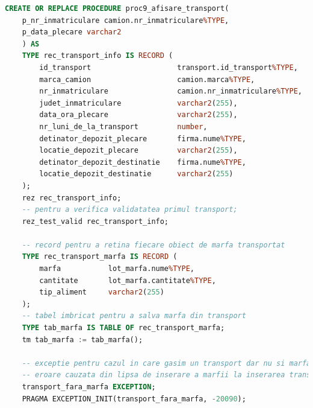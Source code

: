 \documentclass[12pt, a4paper]{article}
\begin{document}
\begin{lstlisting}[language=SQL]
CREATE OR REPLACE PROCEDURE proc9_afisare_transport(
    p_nr_inmatriculare camion.nr_inmatriculare%TYPE,
    p_data_plecare varchar2
    ) AS
    TYPE rec_transport_info IS RECORD (
        id_transport                    transport.id_transport%TYPE,
        marca_camion                    camion.marca%TYPE,
        nr_inmatriculare                camion.nr_inmatriculare%TYPE,
        judet_inmatriculare             varchar2(255),
        data_ora_plecare                varchar2(255),
        nr_luni_de_la_transport         number,
        detinator_depozit_plecare       firma.nume%TYPE,
        locatie_depozit_plecare         varchar2(255),
        detinator_depozit_destinatie    firma.nume%TYPE,
        locatie_depozit_destinatie      varchar2(255)
    );
    rez rec_transport_info;
    -- pentru a verifica validatatea primul transport;
    rez_test_valid rec_transport_info;

    -- record pentru a retina fiecare obiect de marfa transportat
    TYPE rec_transport_marfa IS RECORD (
        marfa           lot_marfa.nume%TYPE,
        cantitate       lot_marfa.cantitate%TYPE,
        tip_aliment     varchar2(255)
    );
    -- tabel imbricat pentru a salva marfa din transport
    TYPE tab_marfa IS TABLE OF rec_transport_marfa;
    tm tab_marfa := tab_marfa();
    
    -- exceptie pentru cazul in care gasim un transport dar nu si marfa acestuia
    -- eroare cauzata din lipsa de inserare a marfii la inserarea transportului
    transport_fara_marfa EXCEPTION;
    PRAGMA EXCEPTION_INIT(transport_fara_marfa, -20090);
    

\end{lstlisting}
\end{document}
